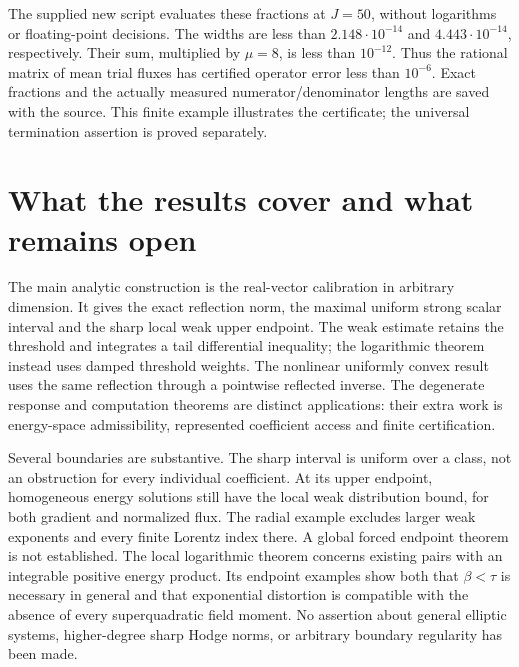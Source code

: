 \documentclass[11pt,a4paper]{article}
\numberwithin{equation}{section}
\theoremstyle{definition}
\theoremstyle{remark}\newtheorem{remark}[theorem]{Remark}
\begin{document}
The supplied new script evaluates these fractions at \(J=50\),
without logarithms or floating-point decisions.
The widths are less than \(2.148\cdot10^{-14}\) and
\(4.443\cdot10^{-14}\), respectively. Their sum, multiplied by
\(\mu=8\), is less than \(10^{-12}\). Thus the rational matrix of
mean trial fluxes has certified operator error less than \(10^{-6}\).
Exact fractions and the actually measured numerator/denominator lengths
are saved with the source. This finite example illustrates the
certificate; the universal termination assertion is proved separately.



\section{What the results cover and what remains open}

The main analytic construction is the real-vector calibration in
arbitrary dimension. It gives the exact reflection norm, the maximal
uniform strong scalar interval and the sharp local weak upper endpoint.
The weak estimate retains the threshold and integrates a tail
differential inequality; the logarithmic theorem instead uses
damped threshold weights. The nonlinear uniformly convex
result uses the same reflection through a pointwise reflected inverse.
The degenerate response and computation theorems are distinct
applications: their extra work is energy-space admissibility,
represented coefficient access and finite certification.

Several boundaries are substantive. The sharp interval is uniform over
a class, not an obstruction for every individual coefficient.
At its upper endpoint, homogeneous energy solutions still have
the local weak distribution bound, for both gradient and normalized
flux. The radial example excludes larger weak exponents and every
finite Lorentz index there. A global forced endpoint theorem is not
established. The local
logarithmic theorem concerns existing pairs with an integrable positive
energy product. Its endpoint examples show both that \(\beta<\tau\)
is necessary in general and that exponential distortion is compatible
with the absence of every superquadratic field moment.
No assertion about general elliptic systems, higher-degree sharp
Hodge norms, or arbitrary boundary regularity has been made.
\end{document}
